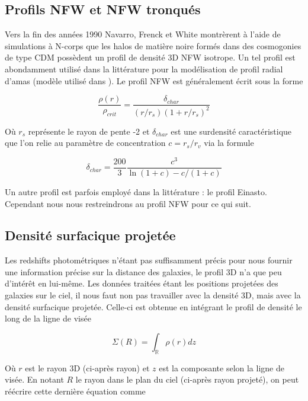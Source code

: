 \documentclass[a4paper,11pt]{article}
\numberwithin{equation}{section}
\begin{document}
  \subsection{Profils NFW et NFW tronqués}
    Vers la fin des années 1990 Navarro, Frenck et White montrèrent à l'aide de simulations à N-corps que les halos de matière noire formés dans des cosmogonies de type CDM possèdent un profil de densité 3D NFW isotrope.
	Un tel profil est abondamment utilisé dans la littérature pour la modélisation de profil radial d'amas (modèle utilisé dans \cite{AMICO}). 
    Le profil NFW est généralement écrit sous la forme\cite{NFW1996}
    
    \begin{equation}
      \label{eq:NFW_profile}
      \frac{\rho(r)}{\rho_{crit}} = \frac{\delta_{char}}{(r/r_s) ( 1 + r / r_s)^2}
    \end{equation}
    
    Où $r_s$ représente le rayon de pente -2 et $\delta_{char}$ est une surdensité caractéristique que l'on relie au paramètre de concentration $c = r_s / r_v$ via la formule\cite{Mo_concentration}
    
    \begin{equation}
      \delta_{char} = \frac{200}{3} \frac{c^3}{\ln(1+c) - c / (1+c)}
    \end{equation}
    
	Un autre profil est parfois employé dans la littérature : le profil Einasto. Cependant nous nous restreindrons au profil NFW pour ce qui suit.
    
  \subsection{Densité surfacique projetée}
  \label{Densité_surfacique_projetée}
  	Les redshifts photométriques n'étant pas suffisamment précis pour nous fournir une information précise sur la distance des galaxies, le profil 3D n'a que peu d'intérêt en lui-même. 
    Les données traitées étant les positions projetées des galaxies sur le ciel, il nous faut non pas travailler avec la densité 3D, mais avec la densité surfacique projetée. Celle-ci est obtenue en intégrant le profil de densité le long de la ligne de visée
    
    \begin{equation}
      \Sigma (R) = \int_{\mathbb{R}} \rho (r) dz
    \end{equation}
    
    Où $r$ est le rayon 3D (ci-après rayon) et $z$ est la composante selon la ligne de visée. En notant $R$ le rayon dans le plan du ciel (ci-après rayon projeté), on peut réécrire cette dernière équation comme
    
\end{document}

